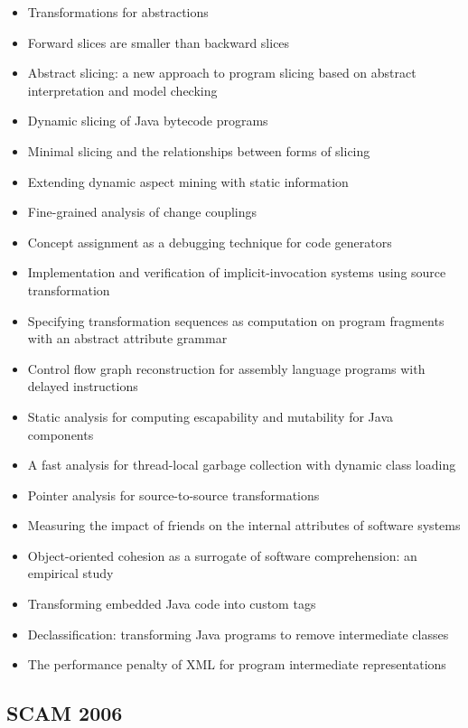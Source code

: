 {\small
\begin{itemize}[itemsep=-1ex]
  \item Transformations for abstractions
  \item Forward slices are smaller than backward slices
  \item Abstract slicing: a new approach to program slicing based on abstract interpretation and model checking
  \item Dynamic slicing of Java bytecode programs
  \item Minimal slicing and the relationships between forms of slicing
  \item Extending dynamic aspect mining with static information
  \item Fine-grained analysis of change couplings
  \item Concept assignment as a debugging technique for code generators
  \item Implementation and verification of implicit-invocation systems using source transformation
  \item Specifying transformation sequences as computation on program fragments with an abstract attribute grammar
  \item Control flow graph reconstruction for assembly language programs with delayed instructions
  \item Static analysis for computing escapability and mutability for Java components
  \item A fast analysis for thread-local garbage collection with dynamic class loading
  \item Pointer analysis for source-to-source transformations
  \item Measuring the impact of friends on the internal attributes of software systems
  \item Object-oriented cohesion as a surrogate of software comprehension: an empirical study
  \item Transforming embedded Java code into custom tags
  \item Declassification: transforming Java programs to remove intermediate classes
  \item The performance penalty of XML for program intermediate representations
\end{itemize}
}

\subsection{SCAM 2006}

